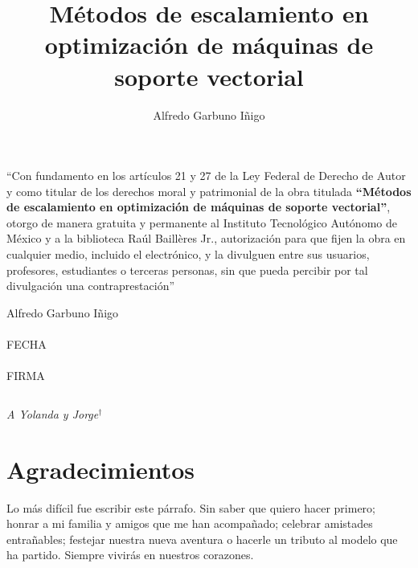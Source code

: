 \documentclass[10pt,oneside, chapterprefix]{scrbook} %
\title{Métodos de escalamiento en optimización de máquinas de soporte vectorial}
\author{Alfredo Garbuno Iñigo}
\date{}
\begin{document}


\newpage
\section*{\phantom{Declaración}}
``Con fundamento en los artículos 21 y 27 de la Ley Federal de Derecho de Autor y como titular de los derechos moral y patrimonial de la obra titulada \textbf{``Métodos de escalamiento en optimización de máquinas de soporte vectorial''}, otorgo de manera gratuita y permanente al Instituto Tecnológico Autónomo de México y a la biblioteca Raúl Baillères Jr., autorización para que fijen la obra en cualquier medio, incluido el electrónico, y la divulguen entre sus usuarios, profesores, estudiantes o terceras personas, sin que pueda percibir por tal divulgación una contraprestación''
    \vspace{2em}
    \\ \begin{center}
    \vspace{2em}
      {Alfredo Garbuno Iñigo } \\
       \phantom{espacio} 
      \vspace{5em}
      \underline{ }\\
      \small{FECHA}      \\
        \phantom{espacio} 
      \vspace{5em}
      \underline{ }\\
      \small{FIRMA} 
      \end{center}

\newpage
\thispagestyle{empty}
$\,$
\vspace{5.7cm}
\begin{flushright}
{\em {\Large A Yolanda y Jorge$^{\dagger}$}}
\end{flushright}
\clearpage

\thispagestyle{empty}
\section*{Agradecimientos}

\noindent Lo más difícil fue escribir este párrafo. Sin saber que quiero hacer primero; honrar a mi familia y amigos que me han acompañado; celebrar amistades entrañables; festejar nuestra nueva aventura o hacerle un tributo al modelo que ha partido. Siempre vivirás en nuestros corazones.
\end{document}
